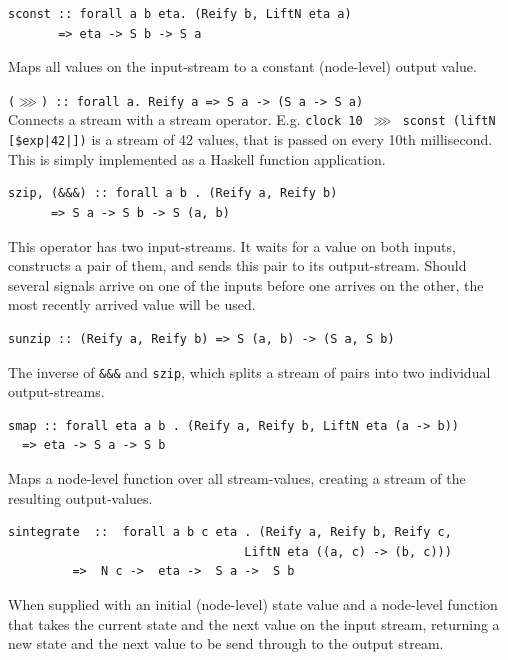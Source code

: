 \documentclass[a4paper, oneside, final]{memoir}
\begin{document}
\begin{description}
\item
\begin{verbatim}
sconst :: forall a b eta. (Reify b, LiftN eta a)
       => eta -> S b -> S a
\end{verbatim}
     Maps all values on the input-stream to a constant (node-level) output value.

\item \texttt{($\ggg$) :: forall a. Reify a => S a -> (S a -> S a)}
  \hfill \\ Connects a stream with a stream operator.
  E.g. \texttt{clock 10 $\ggg$ sconst (liftN [\$exp|42|])} is a stream
  of 42 values, that is passed on every 10th millisecond. This is
  simply implemented as a Haskell function application.


\item 
\label{item:szip}
\begin{verbatim}
szip, (&&&) :: forall a b . (Reify a, Reify b)
      => S a -> S b -> S (a, b)
\end{verbatim}
  This operator has two input-streams. It waits for a value on both
  inputs, constructs a pair of them, and sends this pair to its
  output-stream.  Should several signals arrive on one of the inputs
  before one arrives on the other, the most recently arrived value
  will be used.

\item 
\begin{verbatim}
sunzip :: (Reify a, Reify b) => S (a, b) -> (S a, S b)
\end{verbatim}
  The inverse of \texttt{\&\&\&} and \texttt{szip}, which splits a
  stream of pairs into two individual output-streams.

\item 
\begin{verbatim}
smap :: forall eta a b . (Reify a, Reify b, LiftN eta (a -> b))
  => eta -> S a -> S b
\end{verbatim}
  Maps a node-level function over all stream-values, creating a stream
  of the resulting output-values.

\item
\begin{verbatim}
sintegrate  ::  forall a b c eta . (Reify a, Reify b, Reify c,
                                 LiftN eta ((a, c) -> (b, c)))
         =>  N c ->  eta ->  S a ->  S b
\end{verbatim}
  When supplied with an initial (node-level) state value and a
  node-level function that takes the current state and the next value
  on the input stream, returning a new state and the next value to be
  send through to the output stream.


\end{description}
\end{document}
